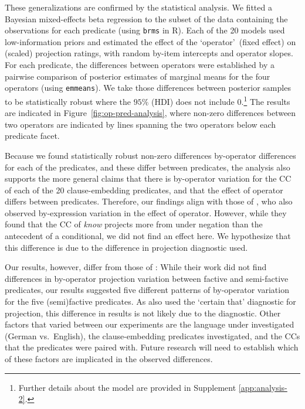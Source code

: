 \documentclass[a4paper,12pt,twoside]{article}
\begin{document}
        These generalizations are confirmed by the statistical analysis. We fitted a Bayesian mixed-effects beta regression to the subset of the data containing the observations for each predicate (using \texttt{brms} in R). Each of the 20 models used low-information priors and estimated the effect of the \lq operator\rq\ (fixed effect) on (scaled) projection ratings, with random by-item intercepts and operator slopes. For each predicate, the differences between operators were established by a pairwise comparison of posterior estimates of marginal means for the four operators (using \texttt{emmeans}). We take those differences between posterior samples to be statistically robust where the $95\%$ (HDI) does not include $0$.\footnote{Further details about the model are provided in Supplement \ref{app:analysis-2}.} The results are indicated in Figure~\ref{fig:op-pred-analysis}, where non-zero differences between two operators are indicated by lines spanning the two operators below each predicate facet.

        Because we found statistically robust non-zero differences by-operator differences for each of the predicates, and these differ between predicates, the analysis also supports the more general claims that there is by-operator variation for the CC of each of the 20 clause-embedding predicates, and that the effect of operator differs between predicates.
        Therefore, our findings align with those of \citealt{smith_relationship_2014}, who also observed by-expression variation in the effect of operator. However, while they found that the CC of \emph{know} projects more from under negation than the antecedent of a conditional, we did not find an effect here. We hypothesize that this difference is due to the difference in projection diagnostic used. 
        
        Our results, however, differ from those of \citealt{sieker_projective_2022}: While their work did not find differences in by-operator projection variation between factive and semi-factive predicates, our results suggested five different patterns of by-operator variation for the five (semi)factive predicates. As \citealt{sieker_projective_2022} also used the `certain that' diagnostic for projection, this difference in results is not likely due to the diagnostic. Other factors that varied between our experiments are the language under investigated (German vs.\ English), the clause-embedding predicates investigated, and the CCs that the predicates were paired with. Future research will need to establish which of these factors are implicated in the observed differences.
   
\end{document}

